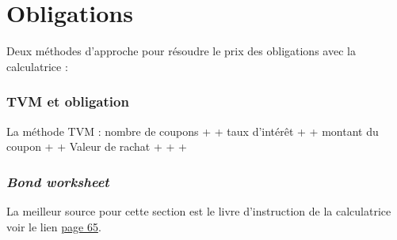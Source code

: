 \documentclass[11pt,french]{report}
\begin{document}
\chapter{Obligations}
\label{obligation}

Deux méthodes d'approche pour résoudre le prix des obligations avec la calculatrice :

\subsection{TVM et obligation}
\label{anex:TVM et obligation}

La méthode TVM :  nombre de coupons +  + taux d'intérêt +  + montant du coupon +  + Valeur de rachat +  +  + 

\subsection{\textit{Bond worksheet}}
\label{anex:bond worksheet}

La meilleur source pour cette section est le livre d'instruction de la calculatrice voir le lien \href{https://drive.google.com/open?id=0B6kXivc6X9LIMXI4T1QtcTFQNzA}{page 65}. 
\end{document}
